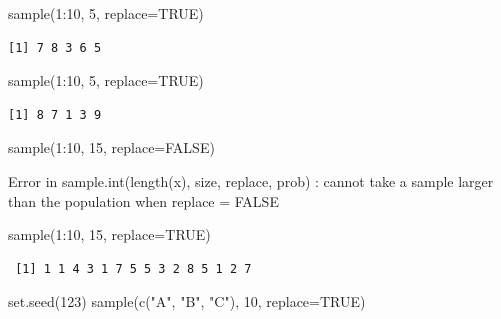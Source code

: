 \documentclass[
  letterpaper,
  DIV=11,
  numbers=noendperiod]{scrreprt}
\newenvironment{Shaded}{\begin{snugshade}}{\end{snugshade}}
\newcommand{\AttributeTok}[1]{\textcolor[rgb]{0.40,0.45,0.13}{#1}}
\newcommand{\ConstantTok}[1]{\textcolor[rgb]{0.56,0.35,0.01}{#1}}
\newcommand{\DecValTok}[1]{\textcolor[rgb]{0.68,0.00,0.00}{#1}}
\newcommand{\FunctionTok}[1]{\textcolor[rgb]{0.28,0.35,0.67}{#1}}
\newcommand{\NormalTok}[1]{\textcolor[rgb]{0.00,0.23,0.31}{#1}}
\newcommand{\SpecialCharTok}[1]{\textcolor[rgb]{0.37,0.37,0.37}{#1}}
\newcommand{\StringTok}[1]{\textcolor[rgb]{0.13,0.47,0.30}{#1}}
\begin{document}
\begin{Shaded}
\begin{Highlighting}[]
\FunctionTok{sample}\NormalTok{(}\DecValTok{1}\SpecialCharTok{:}\DecValTok{10}\NormalTok{, }\DecValTok{5}\NormalTok{, }\AttributeTok{replace=}\ConstantTok{TRUE}\NormalTok{)}
\end{Highlighting}
\end{Shaded}

\begin{verbatim}
[1] 7 8 3 6 5
\end{verbatim}

\begin{Shaded}
\begin{Highlighting}[]
\FunctionTok{sample}\NormalTok{(}\DecValTok{1}\SpecialCharTok{:}\DecValTok{10}\NormalTok{, }\DecValTok{5}\NormalTok{, }\AttributeTok{replace=}\ConstantTok{TRUE}\NormalTok{)}
\end{Highlighting}
\end{Shaded}

\begin{verbatim}
[1] 8 7 1 3 9
\end{verbatim}

\begin{Shaded}
\begin{Highlighting}[]
\FunctionTok{sample}\NormalTok{(}\DecValTok{1}\SpecialCharTok{:}\DecValTok{10}\NormalTok{, }\DecValTok{15}\NormalTok{, }\AttributeTok{replace=}\ConstantTok{FALSE}\NormalTok{)}
\end{Highlighting}
\end{Shaded}

{Error in sample.int(length(x), size, replace, prob) : cannot take a
sample larger than the population when \textquotesingle replace =
FALSE\textquotesingle{}}

\begin{Shaded}
\begin{Highlighting}[]
\FunctionTok{sample}\NormalTok{(}\DecValTok{1}\SpecialCharTok{:}\DecValTok{10}\NormalTok{, }\DecValTok{15}\NormalTok{, }\AttributeTok{replace=}\ConstantTok{TRUE}\NormalTok{)}
\end{Highlighting}
\end{Shaded}

\begin{verbatim}
 [1] 1 1 4 3 1 7 5 5 3 2 8 5 1 2 7
\end{verbatim}

\begin{Shaded}
\begin{Highlighting}[]
\FunctionTok{set.seed}\NormalTok{(}\DecValTok{123}\NormalTok{)}
\FunctionTok{sample}\NormalTok{(}\FunctionTok{c}\NormalTok{(}\StringTok{"A"}\NormalTok{, }\StringTok{"B"}\NormalTok{, }\StringTok{"C"}\NormalTok{), }\DecValTok{10}\NormalTok{, }\AttributeTok{replace=}\ConstantTok{TRUE}\NormalTok{)}
\end{Highlighting}
\end{Shaded}
\end{document}

